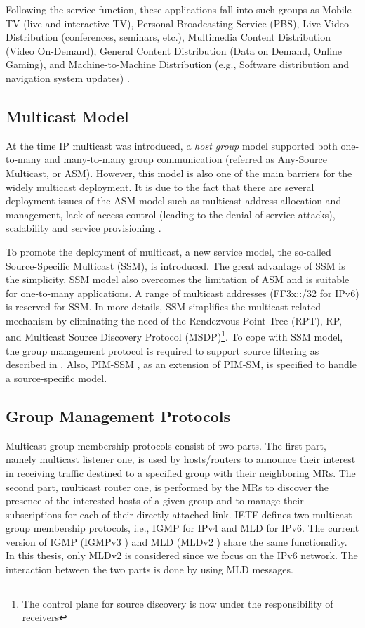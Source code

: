 Following the service function, these applications fall into such groups as Mobile TV (live and interactive TV), Personal Broadcasting Service (PBS), Live Video Distribution (conferences, seminars, etc.), Multimedia Content Distribution (Video On-Demand), General Content Distribution (Data on Demand, Online Gaming), and Machine-to-Machine Distribution (e.g., Software distribution and navigation system updates) \cite{multicast_3g_networks}. 
 
 \subsection{Multicast Model}
At the time IP multicast was introduced, a \textit{host group} model supported both one-to-many and many-to-many group communication (referred as Any-Source Multicast, or ASM). However, this model is also one of the main barriers for the widely multicast deployment. It is due to the fact that there are several deployment issues of the ASM model such as multicast address allocation and management, lack of access control (leading to the denial of service attacks), scalability and service provisioning \cite{overview_SSM,SSM}.   

To promote the deployment of multicast, a new service model, the so-called Source-Specific Multicast (SSM), is introduced. The great advantage of SSM is the simplicity. SSM model also overcomes the limitation of ASM and is suitable for one-to-many applications. 
A range of multicast addresses (FF3x::/32 for IPv6) is reserved for SSM. In more details, SSM simplifies the multicast related mechanism by eliminating the need of the Rendezvous-Point Tree (RPT), RP, and Multicast Source Discovery Protocol (MSDP)\footnote{ The control plane for source discovery is now under the responsibility of receivers}. To cope with SSM model, the group management protocol is required to support source filtering as described in \cite{MLD_SSM}. Also, PIM-SSM \cite{PIM_SM}, as an extension of PIM-SM, is specified to handle a source-specific model.

\subsection{Group Management Protocols}
Multicast group membership protocols consist of two parts. The first part, namely multicast listener one, is used by hosts/routers to announce their interest in receiving traffic destined to a specified group with their neighboring MRs. 
The second part, multicast router one, is performed by the MRs to discover the presence of the interested hosts of a given group and to manage their subscriptions for each of their directly attached link. IETF defines two multicast group membership protocols, i.e., IGMP \cite{RFC1112, IGMPv2, IGMPv3} for IPv4 and MLD \cite{MLDv1,MLDv2} for IPv6. The current version of IGMP (IGMPv3 \cite{IGMPv3}) and MLD (MLDv2 \cite{MLDv2}) share the same functionality. In this thesis, only MLDv2 is considered since we focus on the IPv6 network. The interaction between the two parts is done by using MLD messages. 

